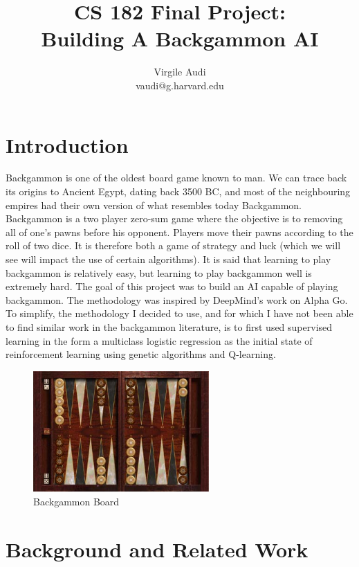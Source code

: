 \documentclass[11pt]{article}
\title{CS 182 Final Project: \\ Building A Backgammon AI}
\author{Virgile Audi \\ vaudi@g.harvard.edu}
\begin{document}
\maketitle{}


\section{Introduction}

Backgammon is one of the oldest board game known to man. We can trace back its origins to Ancient Egypt, dating back 3500 BC, and most of the neighbouring empires had their own version of what resembles today Backgammon. Backgammon is a two player zero-sum game where the objective is to removing all of one's pawns before his opponent. Players move their pawns according to the roll of two dice. It is therefore both a game of strategy and luck (which we will see will impact the use of certain algorithms). It is said that learning to play backgammon is relatively easy, but learning to play backgammon well is extremely hard. The goal of this project was to build an AI capable of playing backgammon. The methodology was inspired by DeepMind's work on Alpha Go. To simplify, the methodology I decided to use, and for which I have not been able to find similar work in the backgammon literature, is to first used supervised learning in the form a multiclass logistic regression as the initial state of reinforcement learning using genetic algorithms and Q-learning. 

\begin{figure}[H]
\begin{center}
    \includegraphics[width=0.6\textwidth]{board.jpg}
\end{center}
\caption{Backgammon Board}
\end{figure}

\section{Background and Related Work}
\end{document}
